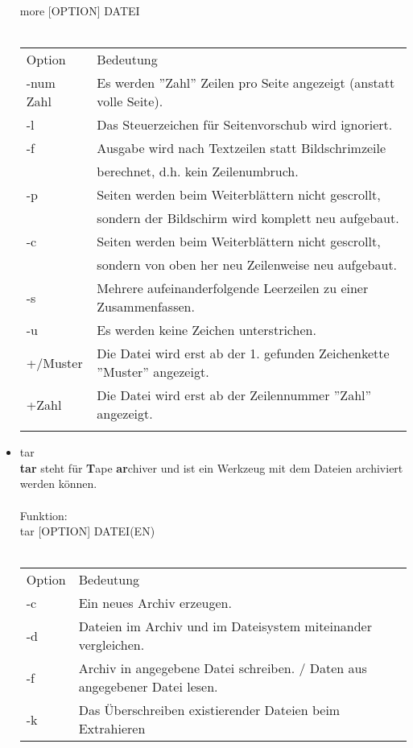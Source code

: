 \begin{itemize}
			more [OPTION] DATEI\\ \\
			\begin{tabular}{ll}
				Option & Bedeutung \\
				-num Zahl & Es werden ''Zahl'' Zeilen pro Seite angezeigt (anstatt volle Seite).\\
				-l & Das Steuerzeichen für Seitenvorschub wird ignoriert.\\
				-f & Ausgabe wird nach Textzeilen statt Bildschrimzeile\\
				& berechnet, d.h. kein Zeilenumbruch.\\
				-p & Seiten werden beim Weiterbl\"attern nicht gescrollt,\\
				& sondern der Bildschirm wird komplett neu aufgebaut.\\
				-c & Seiten werden beim Weiterbl\"attern nicht gescrollt,\\
				& sondern von oben her neu Zeilenweise neu aufgebaut.\\
				-s & Mehrere aufeinanderfolgende Leerzeilen zu einer Zusammenfassen.\\
				-u & Es werden keine Zeichen unterstrichen.\\
				+/Muster & Die Datei wird erst ab der 1. gefunden Zeichenkette ''Muster'' angezeigt.\\
				+Zahl & Die Datei wird erst ab der Zeilennummer ''Zahl'' angezeigt.\\ \\
			\end{tabular}
			\newpage
			\item tar\\
			\textbf{tar} steht f\"ur \textbf{T}ape \textbf{ar}chiver und ist ein Werkzeug mit dem Dateien archiviert werden k\"onnen.\\ \\
			Funktion:\\
			tar [OPTION] DATEI(EN)\\ \\
			\begin{tabular}{ll}
				Option & Bedeutung \\
				-c & Ein neues Archiv erzeugen.\\
				-d & Dateien im Archiv und im Dateisystem miteinander vergleichen.\\
				-f & Archiv in angegebene Datei schreiben. / Daten aus angegebener Datei lesen.\\
				-k & Das \"Uberschreiben existierender Dateien beim Extrahieren\\

\end{tabular}
\end{itemize}
